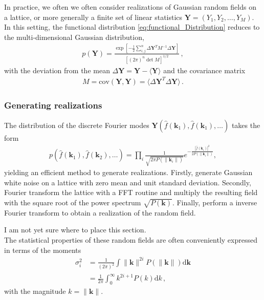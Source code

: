 \documentclass[a4paper, 11pt]{article}
\begin{document}
In practice, we often we often consider realizations of Gaussian random fields on a lattice, or more generally a finite set of linear statistics $\bm{Y}=(Y_1,Y_2,\dots,Y_M)$. In this setting, the functional distribution \eqref{eq:functional_Distribution} reduces to the multi-dimensional Gaussian distribution,
\begin{align}
p(\bm{Y}) = \frac{\exp\left[-\frac{1}{2} \sum_{i,j}^n \Delta \bm{Y}^T M^{-1} \Delta \bm{Y}\right]}{[(2\pi)^n \det M]^{1/2}}\,,
\end{align}
with the deviation from the mean $\Delta \bm{Y} = \bm{Y} - \langle \bm{Y}\rangle$ and the covariance matrix
\begin{align}
M = \text{cov}(\bm{Y},\bm{Y}) = \langle \Delta \bm{Y}^T \Delta \bm{Y}\rangle\,.
\end{align}


\subsubsection{Generating realizations}

The distribution of the discrete Fourier modes $\bm{Y}(\hat{f}(\bm{k}_1),\hat{f}(\bm{k}_1),\dots)$ takes the form 
\begin{align}
p(\hat{f}(\bm{k}_1), \hat{f}(\bm{k}_2), \dots) = \prod_{i} \frac{1}{\sqrt{2\pi P(\| \bm{k}_i\|)}} e^{-\frac{|\hat{f}(\bm{k}_i)|^2}{2P(\|\bm{k}_i\|)}},
\end{align}
yielding an efficient method to generate realizations. Firstly, generate Gaussian white noise on a lattice with zero mean and unit standard deviation. Secondly, Fourier transform the lattice with a FFT routine and multiply the resulting field with the square root of the power spectrum $\sqrt{P(\bm{k})}$. Finally, perform a inverse Fourier transform to obtain a realization of the random field.


\begin{framed}
{\color{red} I am not yet sure where to place this section. }\\

The statistical properties of these random fields are often conveniently expressed in terms of the moments
\begin{align}
\sigma_i^2 &= \frac{1}{(2\pi)^2} \int \|\bm{k}\|^{2i}P(\|\bm{k}\|)\mathrm{d}\bm{k}\nonumber\\
&= \frac{1}{2\pi} \int_0^\infty k^{2i+1}P(k)\mathrm{d}k\,,
\end{align}
with the magnitude $k = \|\bm{k}\|$.
\end{framed}
\end{document}
